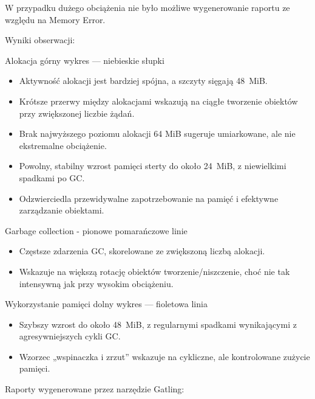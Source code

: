 \documentclass[runningheads,12pt]{llncs}
\begin{document}
W przypadku dużego obciążenia nie było możliwe wygenerowanie raportu ze względu na Memory Error.

Wyniki obserwacji:

Alokacja górny wykres — niebieskie słupki

\begin{itemize}
  \item Aktywność alokacji jest bardziej spójna, a szczyty sięgają 48~MiB.
  \item Krótsze przerwy między alokacjami wskazują na ciągłe tworzenie obiektów przy zwiększonej liczbie żądań.
  \item Brak najwyższego poziomu alokacji 64 MiB sugeruje umiarkowane, ale nie ekstremalne obciążenie.
\end{itemize}

\begin{itemize}
  \item Powolny, stabilny wzrost pamięci sterty do około 24~MiB, z niewielkimi spadkami po GC.
  \item Odzwierciedla przewidywalne zapotrzebowanie na pamięć i efektywne zarządzanie obiektami.
\end{itemize}

Garbage collection - pionowe pomarańczowe linie

\begin{itemize}
  \item Częstsze zdarzenia GC, skorelowane ze zwiększoną liczbą alokacji.
  \item Wskazuje na większą rotację obiektów tworzenie/niszczenie, choć nie tak intensywną jak przy wysokim obciążeniu.
\end{itemize}

Wykorzystanie pamięci dolny wykres — fioletowa linia

\begin{itemize}
  \item Szybszy wzrost do około 48~MiB, z regularnymi spadkami wynikającymi z agresywniejszych cykli GC.
  \item Wzorzec „wspinaczka i zrzut” wskazuje na cykliczne, ale kontrolowane zużycie pamięci.
\end{itemize}

\newpage

Raporty wygenerowane przez narzędzie Gatling:

\end{document}
